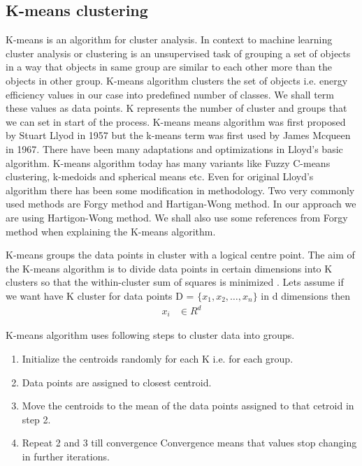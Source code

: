 \subsection{K-means clustering}
K-means is an algorithm for cluster analysis. In context to machine learning cluster analysis or clustering is an unsupervised task of grouping a set of objects in a way that objects in same group are similar to each other more than the objects in other group. K-means algorithm clusters the set of objects i.e. energy efficiency values in our case into predefined number of classes. We shall term these values as data points. K represents the number  of cluster and groups that we can set in start of the process. K-means means algorithm was first proposed by Stuart Llyod in 1957\cite{lloyd1982least} but the k-means term was first used by James Mcqueen in 1967\cite{macqueen1967some}. There have been many  adaptations and optimizations in Lloyd's basic algorithm. K-means algorithm today has many variants like Fuzzy C-means clustering, k-medoids and spherical means etc. Even for original Lloyd's algorithm there has been some modification in methodology. Two very commonly used methods are Forgy method \cite{forgy1965cluster} and Hartigan-Wong method\cite{hartigan1979algorithm}. In our approach we are using Hartigon-Wong method. We shall also use some references from Forgy method when explaining the K-means algorithm. 

K-means groups the data points in cluster with a logical centre point. The aim of the K-means algorithm is to divide data points in certain dimensions into K clusters so that the within-cluster sum of squares is minimized \cite{hartigan1979algorithm}. Lets assume if we want have K cluster for data points  D = \(\{x_1,x_2,\dotsc,x_n\}\) in d dimensions then
\begin{align*}
x_{i}& \in R ^{d}
\end{align*}
 
K-means algorithm uses following steps to cluster data into groups\cite{ng2000cs229}.
\begin{enumerate}
  \item Initialize the centroids randomly for each K i.e. for each group. 
  \item Data points are assigned to closest centroid.
  \item Move the centroids to the mean of the data points assigned to that cetroid in step 2.
  \item Repeat 2 and 3 till convergence Convergence means that values stop changing in further iterations.
\end{enumerate} 


